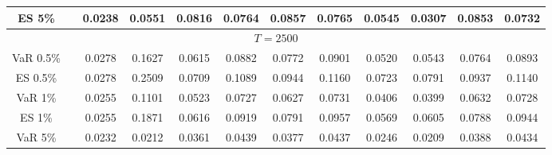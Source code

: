 {{\begin{sidewaystable}
\begin{tabular}{cc cc | cccc | cccc}
ES 5\%  
&& 0.0238 & 0.0551 & 0.0816 & 0.0764 & 0.0857 & 0.0765 &0.0545 & 0.0307 & 0.0853 & 0.0732 \\ 
\hline 
\multicolumn{12}{c}{$T =2500$}  \\ 
\hline 
VaR 0.5\%
&& 0.0278 & 0.1627 & 0.0615 & 0.0882 & 0.0772 & 0.0901 &0.0520 & 0.0543 & 0.0764 & 0.0893 \\ 
ES 0.5\%  
&& 0.0278 & 0.2509 & 0.0709 & 0.1089 & 0.0944 & 0.1160 &0.0723 & 0.0791 & 0.0937 & 0.1140 \\ 
\rowcolor{LightCyan} 
\rowcolor{LightCyan} 
VaR 1\% 
&& 0.0255 & 0.1101 & 0.0523 & 0.0727 & 0.0627 & 0.0731 &0.0406 & 0.0399 & 0.0632 & 0.0728 \\ 
\rowcolor{LightCyan} 
\rowcolor{LightCyan} 
\rowcolor{LightCyan} 
ES 1\% 
&& 0.0255 & 0.1871 & 0.0616 & 0.0919 & 0.0791 & 0.0957 &0.0569 & 0.0605 & 0.0788 & 0.0944 \\ 
VaR 5\% 
&& 0.0232 & 0.0212 & 0.0361 & 0.0439 & 0.0377 & 0.0437 &0.0246 & 0.0209 & 0.0388 & 0.0434 \\ 

\end{tabular}
\end{sidewaystable}}}
